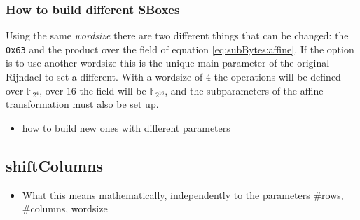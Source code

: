\documentclass[10pt,a4paper,twoside]{llncs}
\newcommand{\Fpn}[2]{\ensuremath{\mathbb{F}_{#1^#2}}}
\begin{document}
\subsubsection{How to build different SBoxes}

Using the same \emph{wordsize} there are two different things that can be changed: the \texttt{0x63} and the product over the field of equation \ref{eq:subBytes:affine}. If the option is to use another wordsize this is the unique main parameter of the original Rijndael to set a different. With a wordsize of $4$ the operations will be defined over \Fpn{2}{4}, over $16$ the field will be \Fpn{2}{{16}}, and the subparameters of the affine transformation must also be set up.

\begin{itemize}
 \item how to build new ones with different parameters
\end{itemize}


\subsection{shiftColumns}
\begin{itemize}
 \item What this means mathematically, independently to the parameters \#rows, \#columns, wordsize
\end{itemize}
\end{document}
